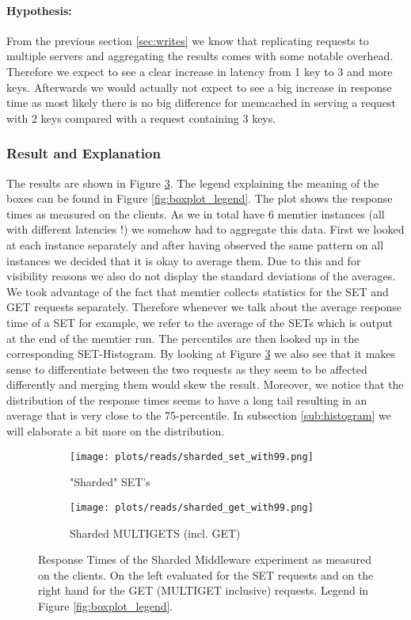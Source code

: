 \documentclass[11pt,a4paper]{article}
\begin{document}
\paragraph{Hypothesis: } From the previous section \ref{sec:writes} we know that replicating requests to multiple servers and aggregating the results comes with some notable overhead. Therefore we expect to see a clear increase in latency from 1 key to 3 and more keys. Afterwards we would actually not expect to see a big increase in response time as most likely there is no big difference for memcached in serving a request with 2 keys compared with a request containing 3 keys. 


\subsubsection{Result and Explanation}
The results are shown in Figure \ref{plt:sharded_with99}. The legend explaining the meaning of the boxes can be found in Figure \ref{fig:boxplot_legend}. The plot shows the response times as measured on the clients. As we in total have 6 memtier instances (all with different latencies !) we somehow had to aggregate this data. First we looked at each instance separately and after having observed the same pattern on all instances we decided that it is okay to average them. Due to this and for visibility reasons we also do not display the standard deviations of the averages. We took advantage of the fact that memtier collects statistics for the SET and GET requests separately. Therefore whenever we talk about the average response time of a SET for example, we refer to the average of the SETs which is output at the end of the memtier run. The percentiles are then looked up in the corresponding SET-Histogram. By looking at Figure \ref{plt:sharded_with99} we also see that it makes sense to differentiate between the two requests as they seem to be affected differently and merging them would skew the result. Moreover, we notice that the distribution of the response times seems to have a long tail resulting in an average that is very close to the 75-percentile. In subsection \ref{sub:histogram} we will elaborate a bit more on the distribution.\\
\begin{figure}
\centering
\begin{subfigure}{.5\textwidth}
     \texttt{[image: plots/reads/sharded\_set\_with99.png]}
    \caption{"Sharded" SET's}
    \label{plt:sharded_set_with99}
    
\end{subfigure}%
\begin{subfigure}{.5\textwidth}
    \texttt{[image: plots/reads/sharded\_get\_with99.png]}
    \caption{Sharded MULTIGETS (incl. GET)}
    \label{plt:sharded_get_with99}

\end{subfigure}
\caption{Response Times of the Sharded Middleware experiment as measured on the clients. On the left evaluated for the SET requests and on the right hand for the GET (MULTIGET inclusive) requests. Legend in Figure \ref{fig:boxplot_legend}.}
\label{plt:sharded_with99}
\end{figure}
\end{document}
